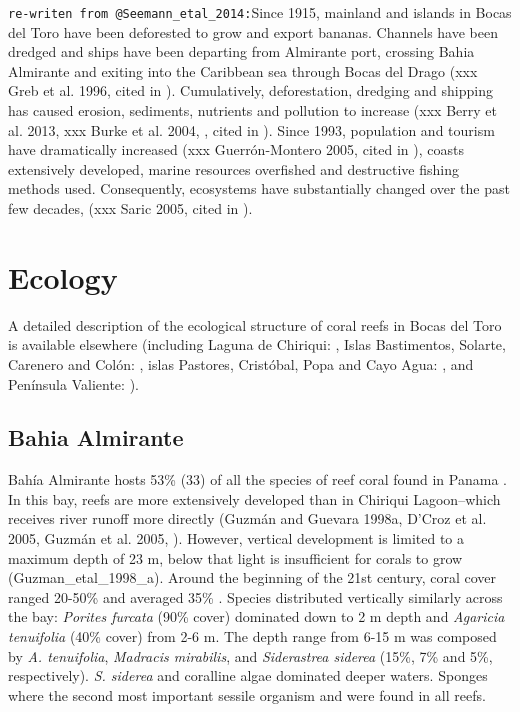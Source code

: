 \documentclass[]{book}
\begin{document}
\texttt{re-writen\ from\ @Seemann\_etal\_2014:}Since 1915, mainland and
islands in Bocas del Toro have been deforested to grow and export
bananas. Channels have been dredged and ships have been departing from
Almirante port, crossing Bahia Almirante and exiting into the Caribbean
sea through Bocas del Drago (xxx Greb et al. 1996, cited in
\citet{Seemann_etal_2014}). Cumulatively, deforestation, dredging and
shipping has caused erosion, sediments, nutrients and pollution to
increase (xxx Berry et al. 2013, xxx Burke et al. 2004, , cited in
\citet{Seemann_etal_2014}). Since 1993, population and tourism have
dramatically increased (xxx Guerrón-Montero 2005, cited in
\citet{Seemann_etal_2014}), coasts extensively developed, marine
resources overfished and destructive fishing methods used. Consequently,
ecosystems have substantially changed over the past few decades, (xxx
Saric 2005, cited in \citet{Seemann_etal_2014}).

\section{Ecology}\label{ecology}

A detailed description of the ecological structure of coral reefs in
Bocas del Toro is available elsewhere (including Laguna de Chiriqui:
\citet{Guzman_etal_1998_a}, Islas Bastimentos, Solarte, Carenero and
Colón: \citet{Guzman_etal_1998_b}, islas Pastores, Cristóbal, Popa and
Cayo Agua: \citet{Guzman_etal_1999}, and Península Valiente:
\citet{Guzman_etal_2001}).

\subsection{Bahia Almirante}\label{bahia-almirante}

Bahía Almirante hosts 53\% (33) of all the species of reef coral found
in Panama \citep[\citet{Guzman_etal_1998_a}]{Guzman_etal_1999}. In this
bay, reefs are more extensively developed than in Chiriqui Lagoon--which
receives river runoff more directly (Guzmán and Guevara 1998a, D'Croz et
al. 2005, Guzmán et al. 2005, \citet{Cramer_2013}). However, vertical
development is limited to a maximum depth of 23 m, below that light is
insufficient for corals to grow (Guzman\_etal\_1998\_a). Around the
beginning of the 21st century, coral cover ranged 20-50\% and averaged
35\% \citep{Guzman_etal_1998_a}. Species distributed vertically
similarly across the bay: \emph{Porites furcata} (90\% cover) dominated
down to 2 m depth and \emph{Agaricia tenuifolia} (40\% cover) from 2-6
m. The depth range from 6-15 m was composed by \emph{A. tenuifolia},
\emph{Madracis mirabilis}, and \emph{Siderastrea siderea} (15\%, 7\% and
5\%, respectively). \emph{S. siderea} and coralline algae dominated
deeper waters. Sponges where the second most important sessile organism
and were found in all reefs.
\end{document}
